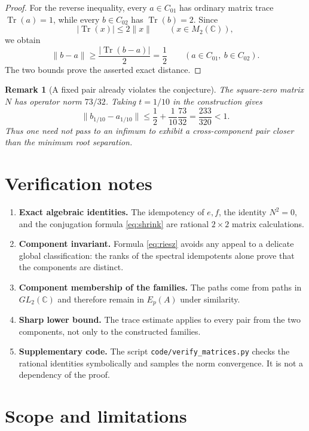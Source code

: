 \documentclass[11pt]{article}
\newtheorem{remark}{Remark}
\newcommand{\C}{\mathbb C}
\newcommand{\Mtwo}{M_2(\C)}
\newcommand{\Tr}{\operatorname{Tr}}
\begin{document}
\begin{proof}
For the reverse inequality, every $a\in C_{01}$ has ordinary matrix trace
$\Tr(a)=1$, while every $b\in C_{02}$ has $\Tr(b)=2$.  Since
\[
 |\Tr(x)|\leq 2\|x\|\qquad(x\in\Mtwo),
\]
we obtain
\[
 \|b-a\|\geq\frac{|\Tr(b-a)|}{2}=\frac12
 \qquad(a\in C_{01},\ b\in C_{02}).
\]
The two bounds prove the asserted exact distance.
\end{proof}

\begin{remark}[A fixed pair already violates the conjecture]
The square-zero matrix $N$ has operator norm $73/32$.  Taking $t=1/10$ in
the construction gives
\[
 \|b_{1/10}-a_{1/10}\|
 \leq \frac12+\frac1{10}\frac{73}{32}
 =\frac{233}{320}<1.
\]
Thus one need not pass to an infimum to exhibit a cross-component pair closer
than the minimum root separation.
\end{remark}

\section{Verification notes}

\begin{enumerate}[leftmargin=*]
\item \textbf{Exact algebraic identities.}  The idempotency of $e,f$, the
identity $N^2=0$, and the conjugation formula \eqref{eq:shrink} are rational
$2\times2$ matrix calculations.
\item \textbf{Component invariant.}  Formula \eqref{eq:riesz} avoids any
appeal to a delicate global classification: the ranks of the spectral
idempotents alone prove that the components are distinct.
\item \textbf{Component membership of the families.}  The paths come from
paths in $GL_2(\C)$ and therefore remain in $E_p(A)$ under similarity.
\item \textbf{Sharp lower bound.}  The trace estimate applies to every pair
from the two components, not only to the constructed families.
\item \textbf{Supplementary code.}  The script
\texttt{code/verify\_matrices.py} checks the rational identities symbolically
and samples the norm convergence.  It is not a dependency of the proof.
\end{enumerate}

\section{\hspace{0.25em}Scope and limitations}
\end{document}
